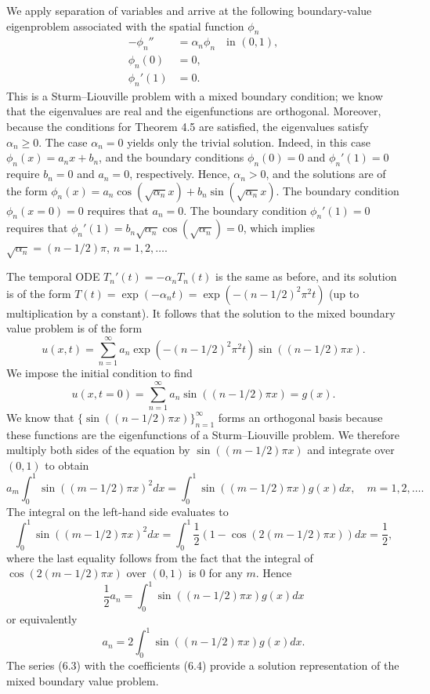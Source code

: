 We apply separation of variables and arrive at the following boundary-value eigenproblem associated with the spatial function $\phi_n$
\begin{align*}
    -\phi_n'' &= \alpha_n \phi_n \quad \text{in } (0, 1), \\
    \phi_n(0) &= 0, \\
    \phi_n'(1) &= 0.
\end{align*}
This is a Sturm--Liouville problem with a mixed boundary condition; we know that the eigenvalues are real and the eigenfunctions are orthogonal. Moreover, because the conditions for Theorem 4.5 are satisfied, the eigenvalues satisfy $\alpha_n \geq 0$. The case $\alpha_n = 0$ yields only the trivial solution. Indeed, in this case $\phi_n(x) = a_n x + b_n$, and the boundary conditions $\phi_n(0) = 0$ and $\phi_n'(1) = 0$ require $b_n = 0$ and $a_n = 0$, respectively. Hence, $\alpha_n > 0$, and the solutions are of the form $\phi_n(x) = a_n \cos(\sqrt{\alpha_n} x) + b_n \sin(\sqrt{\alpha_n} x)$. The boundary condition $\phi_n(x = 0) = 0$ requires that $a_n = 0$. The boundary condition $\phi_n'(1) = 0$ requires that $\phi_n'(1) = b_n \sqrt{\alpha_n} \cos(\sqrt{\alpha_n}) = 0$, which implies $\sqrt{\alpha_n} = (n - 1/2)\pi$, $n = 1, 2, \dots$.

The temporal ODE $T_n'(t) = -\alpha_n T_n(t)$ is the same as before, and its solution is of the form $T(t) = \exp(-\alpha_n t) = \exp(-(n - 1/2)^2\pi^2 t)$ (up to multiplication by a constant). It follows that the solution to the mixed boundary value problem is of the form
\begin{equation*}
    u(x, t) = \sum_{n=1}^{\infty} a_n \exp(-(n - 1/2)^2\pi^2 t) \sin((n - 1/2)\pi x). \tag{6.3}
\end{equation*}
We impose the initial condition to find
\[u(x, t = 0) = \sum_{n=1}^{\infty} a_n \sin((n - 1/2)\pi x) = g(x).\]
We know that $\{\sin((n - 1/2)\pi x)\}_{n=1}^{\infty}$ forms an orthogonal basis because these functions are the eigenfunctions of a Sturm--Liouville problem. We therefore multiply both sides of the equation by $\sin((m - 1/2)\pi x)$ and integrate over $(0, 1)$ to obtain
\[a_m \int_0^1 \sin((m - 1/2)\pi x)^2 dx = \int_0^1 \sin((m - 1/2)\pi x) g(x) dx, \quad m = 1, 2, \dots.\]
The integral on the left-hand side evaluates to
\[\int_0^1 \sin((m - 1/2)\pi x)^2 dx = \int_0^1 \frac{1}{2}(1 - \cos(2(m - 1/2)\pi x)) dx = \frac{1}{2},\]
where the last equality follows from the fact that the integral of $\cos(2(m - 1/2)\pi x)$ over $(0, 1)$ is $0$ for any $m$. Hence
\[\frac{1}{2} a_n = \int_0^1 \sin((n - 1/2)\pi x) g(x) dx\]
or equivalently
\begin{equation*}
    a_n = 2 \int_0^1 \sin((n - 1/2)\pi x) g(x) dx. \tag{6.4}
\end{equation*}
The series (6.3) with the coefficients (6.4) provide a solution representation of the mixed boundary value problem.

